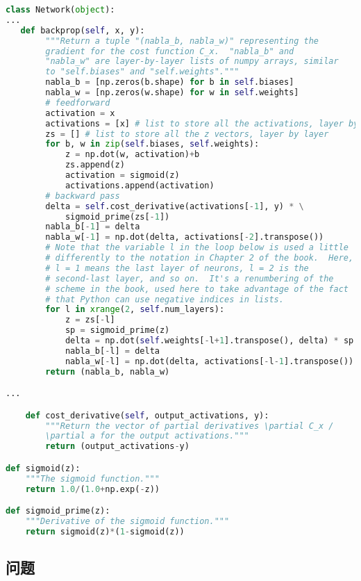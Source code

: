 \begin{lstlisting}[language=Python]
class Network(object):
...
   def backprop(self, x, y):
        """Return a tuple "(nabla_b, nabla_w)" representing the
        gradient for the cost function C_x.  "nabla_b" and
        "nabla_w" are layer-by-layer lists of numpy arrays, similar
        to "self.biases" and "self.weights"."""
        nabla_b = [np.zeros(b.shape) for b in self.biases]
        nabla_w = [np.zeros(w.shape) for w in self.weights]
        # feedforward
        activation = x
        activations = [x] # list to store all the activations, layer by layer
        zs = [] # list to store all the z vectors, layer by layer
        for b, w in zip(self.biases, self.weights):
            z = np.dot(w, activation)+b
            zs.append(z)
            activation = sigmoid(z)
            activations.append(activation)
        # backward pass
        delta = self.cost_derivative(activations[-1], y) * \
            sigmoid_prime(zs[-1])
        nabla_b[-1] = delta
        nabla_w[-1] = np.dot(delta, activations[-2].transpose())
        # Note that the variable l in the loop below is used a little
        # differently to the notation in Chapter 2 of the book.  Here,
        # l = 1 means the last layer of neurons, l = 2 is the
        # second-last layer, and so on.  It's a renumbering of the
        # scheme in the book, used here to take advantage of the fact
        # that Python can use negative indices in lists.
        for l in xrange(2, self.num_layers):
            z = zs[-l]
            sp = sigmoid_prime(z)
            delta = np.dot(self.weights[-l+1].transpose(), delta) * sp
            nabla_b[-l] = delta
            nabla_w[-l] = np.dot(delta, activations[-l-1].transpose())
        return (nabla_b, nabla_w)

...

    def cost_derivative(self, output_activations, y):
        """Return the vector of partial derivatives \partial C_x /
        \partial a for the output activations."""
        return (output_activations-y)

def sigmoid(z):
    """The sigmoid function."""
    return 1.0/(1.0+np.exp(-z))

def sigmoid_prime(z):
    """Derivative of the sigmoid function."""
    return sigmoid(z)*(1-sigmoid(z))
\end{lstlisting}

\subsection*{问题}

